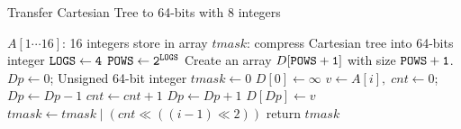 \begin{algorithm*}[!thb]
  \caption{Transfer Cartesian Tree to 64-bits with 8 integers}
  \label{alg:cartesian-to-64bits}
  \begin{algorithmic}[1]
    \Require
      $A[1 \cdots 16]$: 16 integers store in array
    \Ensure 
      $\textit{tmask}$: compress Cartesian tree into 64-bits integer
      \State $\tt{LOGS} \gets 4$
      \State $\tt{POWS} \gets 2^{\tt{LOGS}}$
      \State Create an array $D[\tt{POWS}+1]$ with size $\tt{POWS}+1$.
      \State $\textit{Dp} \gets 0$;
      \State Unsigned 64-bit integer $\textit{tmask} \gets 0$
      \State $D[0] \gets \infty$
        \State $v \gets A[i], \; \textit{cnt} \gets 0$;
          \State $\textit{Dp} \gets \textit{Dp}-1$
          \State $\textit{cnt} \gets \textit{cnt} + 1$
        \EndWhile
        \State $\textit{Dp} \gets \textit{Dp}+1$
        \State $D[\textit{Dp}] \gets v$
        \State $\textit{tmask} \gets \textit{tmask} \mathrel{|} (cnt \ll ((i-1) \ll 2))$
      \EndFor
      \State return $tmask$
  \end{algorithmic}
\end{algorithm*}